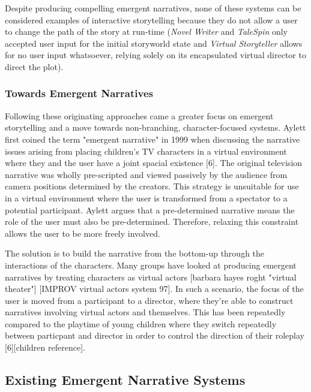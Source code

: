 \documentclass{sig-alternate-05-2015}
\begin{document}
Despite producing compelling emergent narratives, none of these systems can be considered examples of interactive storytelling because they do not allow a user to change the path of the story at run-time (\textit{Novel Writer} and \textit{TaleSpin} only accepted user input for the initial storyworld state and \textit{Virtual Storyteller} allows for no user input whatsoever, relying solely on its encapsulated virtual director to direct the plot).\\

\subsubsection{Towards Emergent Narratives}

\noindent Following these originating approaches came a greater focus on emergent storytelling and a move towards non-branching, character-focused systems. Aylett first coined the term "emergent narrative" in 1999 when discussing the narrative issues arising from placing children's TV characters in a virtual environment where they and the user have a joint spacial existence [6]. The original television narrative was wholly pre-scripted and viewed passively by the audience from camera positions determined by the creators. This strategy is unsuitable for use in a virtual environment where the user is transformed from a spectator to a potential participant. Aylett argues that a pre-determined narrative means the role of the user must also be pre-determined. Therefore, relaxing this constraint allows the user to be more freely involved.

The solution is to build the narrative from the bottom-up through the interactions of the characters. Many groups have looked at producing emergent narratives by treating characters as virtual actors [barbara hayes roght "virtual theater"] [IMPROV virtual actors system 97]. In such a scenario, the focus of the user is moved from a participant to a director, where they're able to construct narratives involving virtual actors and themselves. This has been repeatedly compared to the playtime of young children where they switch repeatedly between particpant and director in order to control the direction of their roleplay [6][children reference]. 

\subsection{Existing Emergent Narrative Systems}
\end{document}
